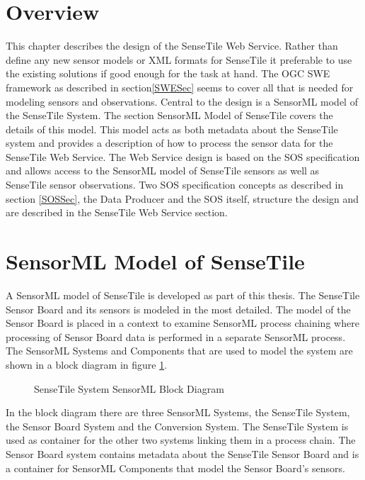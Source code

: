 \documentclass[]{final_report}
\begin{document}
\section{Overview}
This chapter describes the design of the SenseTile Web Service. Rather than define any new sensor models or XML formats for SenseTile it preferable to use the existing solutions if good enough for the task at hand. The OGC SWE framework as described in section\ref{SWESec} seems to cover all that is needed for modeling sensors and observations. Central to the design is a SensorML model of the SenseTile System. The section SensorML Model of SenseTile covers the details of this model. This model acts as both metadata about the SenseTile system and provides a description of how to process the sensor data for the SenseTile Web Service.
The Web Service design is based on the SOS specification and allows access to the SensorML model of SenseTile sensors as well as SenseTile sensor observations. Two SOS specification concepts as described in section \ref{SOSSec}, the Data Producer and the SOS itself, structure the design and are described in the SenseTile Web Service section.

\section{SensorML Model of SenseTile}\label{SenseTileModelSec}

A SensorML model of SenseTile is developed as part of this thesis. The SenseTile Sensor Board and its sensors is modeled in the most detailed. The model of the Sensor Board is placed in a context to examine SensorML process chaining where processing of Sensor Board data is performed in a separate SensorML process.  The SensorML Systems and Components that are used to model the system are shown in a  block diagram in figure \ref{fig:SensorML_SenseTile_System_comp}.

\begin{figure}[h]
\centering
{}
\caption{SenseTile System SensorML Block Diagram}\label{fig:SensorML_SenseTile_System_comp}
\end{figure}

In the block diagram there are three SensorML Systems, the SenseTile System, the Sensor Board System and the Conversion System. The SenseTile System is used as container for the other two systems linking them in a process chain. The Sensor Board system contains metadata about the SenseTile Sensor Board and is a container for SensorML Components that model the Sensor Board's sensors.
\end{document}
